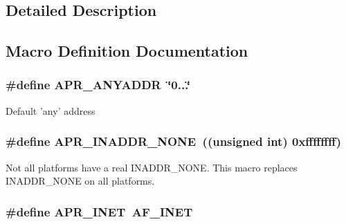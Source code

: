\subsection{Detailed Description}


\subsection{Macro Definition Documentation}
\hypertarget{group__apr__network__io_gadce1131c46b897ec63e9e4316a4631dd}{
\subsubsection[{A\-P\-R\-\_\-\-A\-N\-Y\-A\-D\-D\-R}]{\setlength{\rightskip}{0pt plus 5cm}\#define A\-P\-R\-\_\-\-A\-N\-Y\-A\-D\-D\-R~\char`\"{}0...\char`\"{}}}\label{group__apr__network__io_gadce1131c46b897ec63e9e4316a4631dd}
Default 'any' address \hypertarget{group__apr__network__io_ga16eb7ee55ff87a5093f2114ea5351217}{
\subsubsection[{A\-P\-R\-\_\-\-I\-N\-A\-D\-D\-R\-\_\-\-N\-O\-N\-E}]{\setlength{\rightskip}{0pt plus 5cm}\#define A\-P\-R\-\_\-\-I\-N\-A\-D\-D\-R\-\_\-\-N\-O\-N\-E~((unsigned int) 0xffffffff)}}\label{group__apr__network__io_ga16eb7ee55ff87a5093f2114ea5351217}
Not all platforms have a real I\-N\-A\-D\-D\-R\-\_\-\-N\-O\-N\-E. This macro replaces I\-N\-A\-D\-D\-R\-\_\-\-N\-O\-N\-E on all platforms. \hypertarget{group__apr__network__io_gaa96e8e8dbf92bc77643a4032017b3d67}{
\subsubsection[{A\-P\-R\-\_\-\-I\-N\-E\-T}]{\setlength{\rightskip}{0pt plus 5cm}\#define A\-P\-R\-\_\-\-I\-N\-E\-T~A\-F\-\_\-\-I\-N\-E\-T}}\label{group__apr__network__io_gaa96e8e8dbf92bc77643a4032017b3d67}
